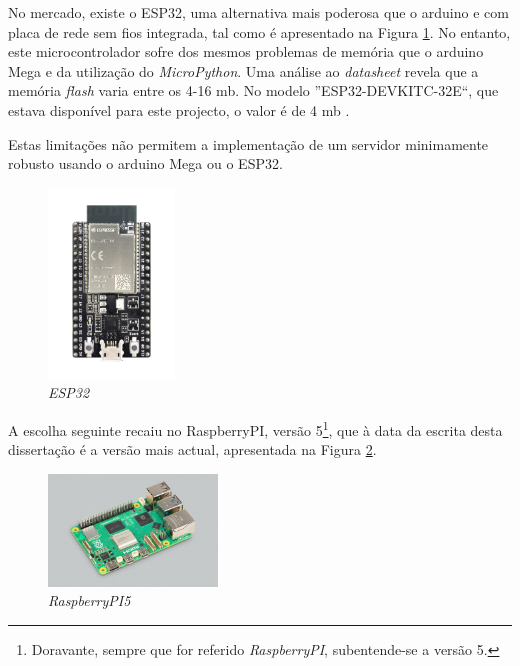 No mercado, existe o \gls{ESP32}, uma alternativa mais poderosa que o \gls{arduino} e com placa de rede sem fios integrada, tal como é apresentado na Figura \ref{fig:ESP32}. No entanto, este microcontrolador sofre dos mesmos problemas de memória que o \gls{arduino} Mega e da utilização do \textit{MicroPython}. Uma análise ao \textit{datasheet} \cite{esp32datasheet} revela que a memória \textit{flash} varia entre os 4-16 \acrlong{mb}. No modelo ''ESP32-DEVKITC-32E``, que estava disponível para este projecto, o valor é de 4 \acrshort{mb} \cite{diferencaspython}.

Estas limitações não permitem a implementação de um servidor minimamente robusto usando o \gls{arduino} Mega ou o \gls{ESP32}.

\begin{figure}[hbtp]
    \centering
    \includegraphics[width=0.3\textwidth]{figures/ESP32-DevKitC_L_0.png}
    \caption{\textit{ESP32} \cite{ESPDevKit}}
    \label{fig:ESP32}
\end{figure}

A escolha seguinte recaiu no \gls{RaspberryPI}, versão 5\footnote{Doravante, sempre que for referido \textit{RaspberryPI}, subentende-se a versão 5.}, que à data da escrita desta dissertação é a versão mais actual, apresentada na Figura \ref{fig:Raspberrypi5}. 

\begin{figure}[hbtp]
    \centering
    \includegraphics[width=0.4\textwidth]{figures/raspberrypi5.jpg}
    \caption{\textit{RaspberryPI5} \cite{introRaspberrypi5}}
    \label{fig:Raspberrypi5}
\end{figure}

